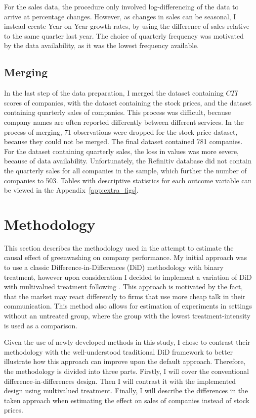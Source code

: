\documentclass[12pt]{article}
\begin{document}
For the sales data, the procedure only involved log-differencing of the data to arrive at percentage changes. However, as changes in sales can be seasonal, I instead create Year-on-Year growth rates, by using the difference of sales relative to the same quarter last year. The choice of quarterly frequency was motivated by the data availability, as it was the lowest frequency available. 


\subsection{Merging}

In the last step of the data preparation, I merged the dataset containing $CTI$ scores of companies, with the dataset containing the stock prices, and the dataset containing quarterly sales of companies. This process was difficult, because company names are often reported differently between different services. In the process of merging, 71 observations were dropped for the stock price dataset, because they could not be merged. The final dataset contained 781 companies. For the dataset containing quarterly sales, the loss in values was more severe, because of data availability. Unfortunately, the Refinitiv database did not contain the quarterly sales for all companies in the sample, which further the number of companies to 503. Tables with descriptive statistics for each outcome variable can be viewed in the Appendix~\ref{app:extra_figs}.


\section{Methodology}\label{sect:methodology}

This section describes the methodology used in the attempt to estimate the causal effect of greenwashing on company performance.
My initial approach was to use a classic Difference-in-Differences (DiD) methodology with binary treatment, however upon consideration I decided to implement a variation of DiD with multivalued treatment following \textcite{callawayDifferenceinDifferencesContinuousTreatment2025}. This approach is motivated by the fact, that the market may react differently to firms that use more cheap talk in their communication. This method also allows for estimation of experiments in settings without an untreated group, where the group with the lowest treatment-intensity is used as a comparison. 

Given the use of newly developed methods in this study, I chose to contrast their methodology with the well-understood traditional DiD framework to better illustrate how this approach can improve upon the default approach. Therefore, the methodology is divided into three parts. Firstly, I will cover the conventional difference-in-differences design. Then I will contrast it with the implemented design using multivalued treatment. Finally, I will describe the differences in the taken approach when estimating the effect on sales of companies instead of stock prices.
\end{document}
